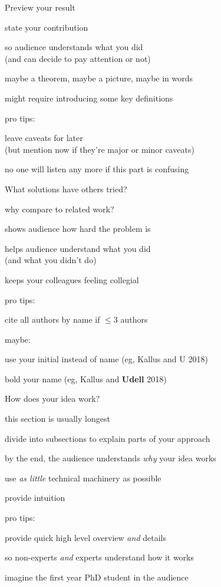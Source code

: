 \documentclass[presentation,xcolor={usenames,dvipsnames}]{beamer}
\begin{document}
\begin{frame}{Preview your result}

state your contribution
\bit
\item so audience understands what you did \\
(and can decide to pay attention or not)
\item maybe a theorem, maybe a picture, maybe in words
\item might require introducing some key definitions
\eit

pro tips:
\bit
\item leave caveats for later \\ (but mention now if they're major or minor caveats)
\item no one will listen any more if this part is confusing
\eit

\end{frame}

\begin{frame}{What solutions have others tried?}

why compare to related work?
\bit
\item shows audience how hard the problem is
\item helps audience understand what you did \\
(and what you didn't do)
\item keeps your colleagues feeling collegial
\eit

pro tips:
\bit
\item cite all authors by name if $\leq 3$ authors
\item maybe:
\bit
\item use your initial instead of name (eg, Kallus and U 2018)
\item bold your name (eg, Kallus and \textbf{Udell} 2018)
\eit
\eit

\end{frame}

\begin{frame}{How does your idea work?}

\bit
\item this section is usually longest
\item divide into subsections to explain parts of your approach
\item by the end, the audience understands \emph{why} your idea works
\item use \emph{as little} technical machinery as possible
\item provide intuition
\eit

pro tips:
\bit
\item provide quick high level overview \emph{and} details
\item so non-experts \emph{and} experts understand how it works
\item imagine the first year PhD student in the audience
\eit

\end{frame}
\end{document}
